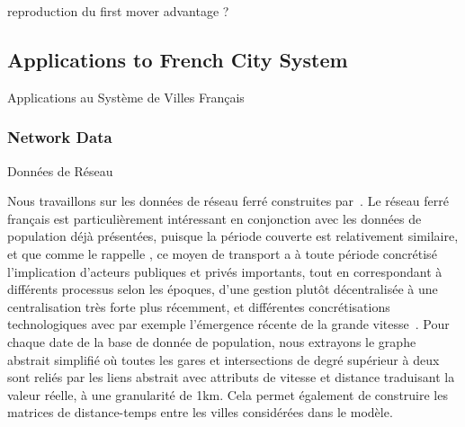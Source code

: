 reproduction du first mover advantage ? \cite{levinson2011does}



\subsection{Applications to French City System}{Applications au Système de Villes Français}






\subsubsection{Network Data}{Données de Réseau}

Nous travaillons sur les données de réseau ferré construites par~\cite{thevenin2013mapping}. Le réseau ferré français est particulièrement intéressant en conjonction avec les données de population déjà présentées, puisque la période couverte est relativement similaire, et que comme le rappelle \cite{thevenin2013mapping}, ce moyen de transport a à toute période concrétisé l'implication d'acteurs publiques et privés importants, tout en correspondant à différents processus selon les époques, d'une gestion plutôt décentralisée à une centralisation très forte plus récemment, et différentes concrétisations technologiques avec par exemple l'émergence récente de la grande vitesse~\cite{zembri1997fondements}. Pour chaque date de la base de donnée de population, nous extrayons le graphe abstrait simplifié où toutes les gares et intersections de degré supérieur à deux sont reliés par les liens abstrait avec attributs de vitesse et distance traduisant la valeur réelle, à une granularité de 1km. Cela permet également de construire les matrices de distance-temps entre les villes considérées dans le modèle.

